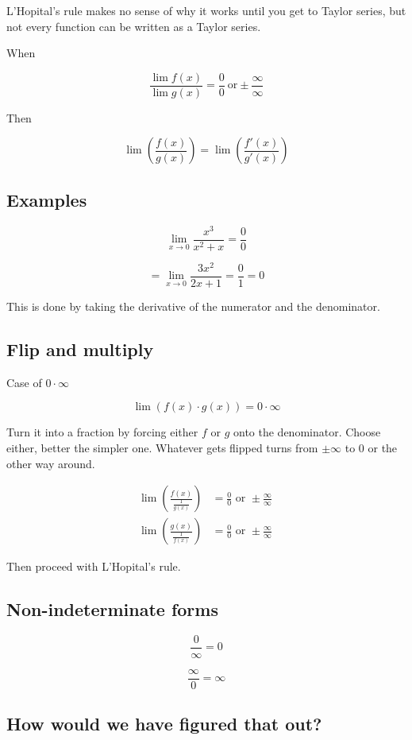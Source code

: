 \documentclass[
]{article}
\begin{document}
L'Hopital's rule makes no sense of why it works until you get to Taylor
series, but not every function can be written as a Taylor series.

When

$$\frac{\lim{f(x)}}{\lim{g(x)}} = \frac{0}{0}\ \text{or} \pm \frac{\infty}{\infty}$$

Then

$$\lim\left( \frac{f(x)}{g(x)} \right) = \lim\left( \frac{f'(x)}{g'(x)} \right)$$


\subsection{Examples}

$$\lim_{x \rightarrow 0}\frac{x^{3}}{x^{2} + x} = \frac{0}{0}$$

$$= \lim_{x \rightarrow 0}\frac{3x^{2}}{2x + 1} = \frac{0}{1} = 0$$

This is done by taking the derivative of the numerator and the
denominator.


\subsection{Flip and multiply}

Case of $0 \cdot \infty$

$$\lim\left( f(x) \cdot g(x) \right) = 0 \cdot \infty$$

Turn it into a fraction by forcing either $f$ or $g$ onto the
denominator. Choose either, better the simpler one. Whatever gets
flipped turns from $\pm \infty$ to 0 or the other way around.

\begin{align*}
\lim\left( \frac{f(x)}{\frac{1}{g(x)}} \right) &= \frac{0}{0}\text{\ or\ } \pm \frac{\infty}{\infty}
 \\
\lim\left( \frac{g(x)}{\frac{1}{f(x)}} \right) &= \frac{0}{0}\text{\ or\ } \pm \frac{\infty}{\infty}\
\end{align*}


Then proceed with L'Hopital's rule.


\subsection{Non-indeterminate forms}

$$\frac{0}{\infty} = 0$$

$$\frac{\infty}{0} = \infty$$


\subsection{How would we have figured that
out?}
\end{document}
